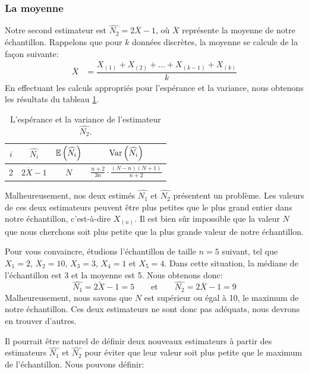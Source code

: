 \documentclass[10pt]{article}
\begin{document}
\hypertarget{la-moyenne}{%
\subsubsection{La moyenne}\label{la-moyenne}}

Notre second estimateur est \(\widehat{N_2}=2\overline{X}-1\), où
\(\overline{X}\) représente la moyenne de notre échantillon. Rappelons
que pour \(k\) données discrètes, la moyenne se calcule de la façon
suivante: \begin{align*}
\overline{X} &= \dfrac{X_{(1)}+X_{(2)}+\ldots +X_{(k-1)}+X_{(k)}}{k}
\end{align*} En effectuant les calculs appropriés pour l'espérance et la
variance, nous obtenons les résultats du tableau
\ref{tab:estimateur_n2}.

\begin{table}[ht]
\begin{center}
\begin{tabular}{cccc}
\toprule
$i$ & $\widehat{N_i}$ & $\operatorname{\mathbb{E}}\left(\widehat{N_i}\right)$ & $\operatorname{Var}\left(\widehat{N_i}\right)$ \\
\midrule
2 & $2\overline{X}-1$ & $N$ & $\frac{n+2}{3n}\cdot\frac{(N-n)(N+1)}{n+2}$ \\
\bottomrule
\end{tabular}
\end{center}
\caption{\label{tab:estimateur_n2} {L'espérance et la variance de l'estimateur $\widehat{N_2}$.} }
\end{table}

Malheureusement, nos deux estimés \(\widehat{N_1}\) et \(\widehat{N_2}\)
présentent un problème. Les valeurs de ces deux estimateurs peuvent être
plus petites que le plus grand entier dans notre échantillon,
c'est-à-dire \(X_{(n)}\). Il est bien sûr impossible que la valeur \(N\)
que nous cherchons soit plus petite que la plus grande valeur de notre
échantillon.

Pour vous convaincre, étudions l'échantillon de taille \(n=5\) suivant,
tel que \(X_1=2\), \(X_2=10\), \(X_3=3\), \(X_4=1\) et \(X_5=4\). Dans
cette situation, la médiane de l'échantillon est 3 et la moyenne est 5.
Nous obtenons donc:
\[\widehat{N_1}=2\widetilde{X}-1=5 \qquad \text{et} \qquad \widehat{N_2}=2\overline{X}-1=9 \]
Malheureusement, nous savons que \(N\) est supérieur ou égal à 10, le
maximum de notre échantillon. Ces deux estimateurs ne sont donc pas
adéquats, nous devrons en trouver d'autres.

Il pourrait être naturel de définir deux nouveaux estimateurs à partir
des estimateurs \(\widehat{N_1}\) et \(\widehat{N_2}\) pour éviter que
leur valeur soit plus petite que le maximum de l'échantillon. Nous
pouvons définir:
\end{document}
